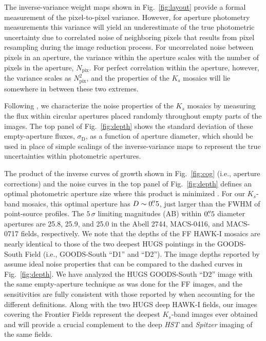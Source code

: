 \documentclass[iop, numberedappendix]{emulateapj}
\begin{document}
The inverse-variance weight maps shown in Fig.~\ref{fig:layout} provide a formal measurement of the pixel-to-pixel variance.  However, for aperture photometry measurements this variance will yield an underestimate of the true photometric uncertainty due to correlated noise of neighboring pixels that results from pixel resampling during the image reduction process.  For uncorrelated noise between pixels in an aperture, the variance within the aperture scales with the number of pixels in the aperture, $N_\mathrm{pix}$.  For perfect correlation within the aperture, however, the variance scales as $N_\mathrm{pix}^2$, and the properties of the $K_s$ mosaics will lie somewhere in between these two extremes.

Following \cite{labbe:03} \citep[see also][]{quadri:musyc, whitaker:nmbs, skelton:14}, we characterize the noise properties of the $K_s$ mosaics by measuring the flux within circular apertures placed randomly throughout empty parts of the images.  The top panel of Fig.~\ref{fig:depth} shows the standard deviation of these empty-aperture fluxes, $\sigma_\mathrm{D}$, as a function of aperture diameter, which should be used in place of simple scalings of the inverse-variance maps to represent the true uncertainties within photometric apertures.  

The product of the inverse curves of growth shown in Fig.~\ref{fig:cog} (i.e., aperture corrections) and the noise curves in the top panel of Fig.~\ref{fig:depth} defines an optimal photometric aperture size where this product is minimized \citep{whitaker:nmbs}.  For our $K_s$-band mosaics, this optimal aperture has $D\sim0\mbox{$.\!\!^{\prime\prime}$}5$, just larger than the FWHM of point-source profiles.  The $5\,\sigma$ limiting magnitudes (AB) within $0\mbox{$.\!\!^{\prime\prime}$}5$ diameter apertures are 25.8, 25.9, and 25.0 in the Abell 2744, MACS-0416, and MACS-0717 fields, respectively.  We note that the depths of the FF HAWK-I mosaics are nearly identical to those of the two deepest HUGS pointings in the GOODS-South Field (i.e., GOODS-South ``D1'' and ``D2'').  The image depths reported by \cite{hugs} assume ideal noise properties that can be compared to the dashed curves in Fig.~\ref{fig:depth}.  We have analyzed the HUGS GOODS-South ``D2'' image with the same empty-aperture technique as was done for the FF images, and the sensitivities are fully consistent with those reported by \cite{hugs} when accounting for the different definitions.  Along with the two HUGS deep HAWK-I fields, our images covering the Frontier Fields represent the deepest $K_s$-band images ever obtained and will provide a crucial complement to the deep \textit{HST} and \textit{Spitzer} imaging of the same fields.
\end{document}
